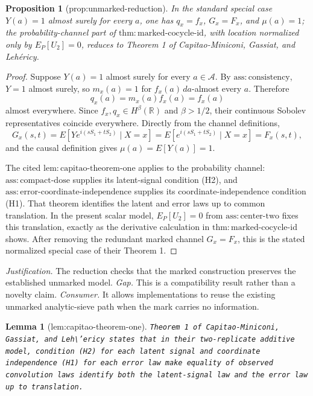 \documentclass{article}
\newtheorem{lemma}{Lemma}
\newtheorem{proposition}{Proposition}
\begin{document}
\begin{proposition}[prop:unmarked-reduction]\label{prop:unmarked-reduction}
In the standard special case \(Y(a)=1\) almost surely for every \(a\), one has \(q_x=f_x\), \(G_x=F_x\), and \(\mu(a)=1\); the probability-channel part of \(\mathrm{thm{:}marked\text{-}cocycle\text{-}id}\), with location normalized only by \(E_P[U_2]=0\), reduces to Theorem 1 of Capitao-Miniconi, Gassiat, and Lehéricy.
\end{proposition}
\begin{proof}
Suppose \(Y(a)=1\) almost surely for every \(a\in\mathcal A\).  By
\(\mathrm{ass{:}consistency}\), \(Y=1\) almost surely, so
\(m_x(a)=1\) for \(f_x(a)\,da\)-almost every \(a\).  Therefore
\[
 q_x(a)=m_x(a)f_x(a)=f_x(a)
\]
almost everywhere.  Since \(f_x,q_x\in H^\beta(\mathbb R)\) and
\(\beta>1/2\), their continuous Sobolev representatives coincide
everywhere.  Directly from the channel definitions,
\[
 G_x(s,t)=E[Ye^{i(sS_1+tS_2)}\mid X=x]
 =E[e^{i(sS_1+tS_2)}\mid X=x]=F_x(s,t),
\]
and the causal definition gives \(\mu(a)=E[Y(a)]=1\).

The cited \(\mathrm{lem{:}capitao\text{-}theorem\text{-}one}\) applies to
the probability channel: \(\mathrm{ass{:}compact\text{-}dose}\) supplies
its latent-signal condition (H2), and
\(\mathrm{ass{:}error\text{-}coordinate\text{-}independence}\) supplies
its coordinate-independence condition (H1).  That theorem identifies the
latent and error laws up to common translation.  In the present scalar
model, \(E_P[U_2]=0\) from \(\mathrm{ass{:}center\text{-}two}\) fixes this
translation, exactly as the derivative calculation in
\(\mathrm{thm{:}marked\text{-}cocycle\text{-}id}\) shows.  After removing
the redundant marked channel \(G_x=F_x\), this is the stated normalized
special case of their Theorem 1.
\end{proof}
\par\smallskip\noindent \textit{Justification.} The reduction checks that the marked construction preserves the established unmarked model. \textit{Gap.} This is a compatibility result rather than a novelty claim. \textit{Consumer.} It allows implementations to reuse the existing unmarked analytic-sieve path when the mark carries no information.

\begin{lemma}[lem:capitao-theorem-one]\label{lem:capitao-theorem-one}
\texttt{Theorem 1 of Capitao-\allowbreak{}Miniconi,\allowbreak{} Gassiat,\allowbreak{} and Leh\textbackslash{}\allowbreak{}'ericy states that in their two-\allowbreak{}replicate additive model,\allowbreak{} condition (H2) for each latent signal and coordinate independence (H1) for each error law make equality of observed convolution laws identify both the latent-\allowbreak{}signal law and the error law up to translation.}
\end{lemma}
\end{document}
